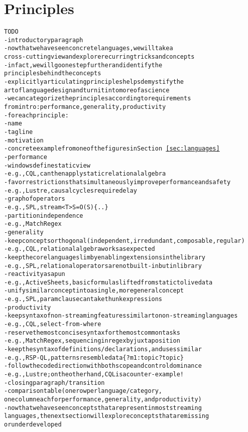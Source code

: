 \section{Principles}\label{sec:principles}

\begin{alltt}TODO\scriptsize
- introductory paragraph
  - now that we have seen concrete languages, we will take a
    cross-cutting view and explore recurring tricks and concepts
  - in fact, we will go one step further and identify the
    principles behind the concepts
  - explicitly articulating principles helps demystify the
    art of language design and turn it into more of a science
  - we can categorize the principles according to requirements
    from intro: performance, generality, productivity
- for each principle:
  - name
  - tagline
  - motivation
  - concrete example from one of the figures in Section~\ref{sec:languages}
- performance
  - windows define static view
    - e.g., CQL, can then apply static relational algebra
  - favor restrictions that simultaneously improve performance and safety
    - e.g., Lustre, causal cycles require delay
  - graph of operators
    - e.g., SPL, stream<T> S = O(S) \{..\}
  - partition independence
    - e.g., MatchRegex
- generality
  - keep concepts orthogonal (independent, irredundant, composable, regular)
    - e.g., CQL, relational algebra works as expected
  - keep the core language slim by enabling extensions in the library
    - e.g., SPL, relational operators are not built-in but in library
  - reactivity as a pun
    - e.g., ActiveSheets, basic formulas lifted from static to live data
  - unify similar concept into a single, more general concept
    - e.g., SPL, param clause can take thunk expressions
- productivity
  - keep syntax of non-streaming features similar to non-streaming languages
    - e.g., CQL, select-from-where
  - reserve the most concise syntax for the most common tasks
    - e.g., MatchRegex, sequencing in regex by juxtaposition
  - keep the syntax of definitions/declarations, and uses similar
    - e.g., RSP-QL, patterns resemble data \{ ?m1 :topic ?topic \}
  - follow the code direction with both scope and control dominance
    - e.g., Lustre; on the other hand, CQL is a counter-example!
- closing paragraph / transition
  - comparison table (one row per language/category,
    one column each for performance, generality, and productivity)
  - now that we have seen concepts that are present in most streaming
    languages, the next section will explore concepts that are missing
    or underdeveloped
\end{alltt}
